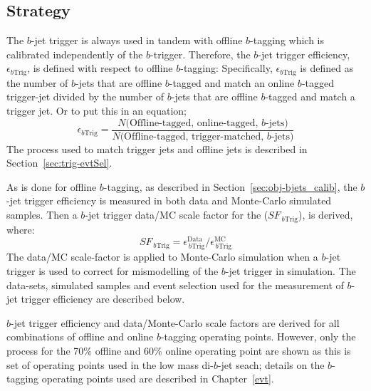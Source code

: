 \subsection{Strategy}
\label{sec:trig-bjet_strat}

The $b$-jet trigger is always used in tandem with offline $b$-tagging which is calibrated independently of the $b$-trigger.
Therefore, the $b$-jet trigger efficiency, $\epsilon_{b\text{Trig}}$, is defined with respect to offline $b$-tagging:
Specifically, $\epsilon_{b\text{Trig}}$ is defined as the number of $b$-jets that are offline $b$-tagged and match an online $b$-tagged trigger-jet
divided by the number of $b$-jets that are offline $b$-tagged and match a trigger jet.
Or to put this in an equation;
\begin{equation}
 \epsilon_{b\text{Trig}} = \frac{N(\text{Offline-tagged, online-tagged, $b$-jets)}}{N(\text{Offline-tagged, trigger-matched, $b$-jets)}}
\end{equation}
The process used to match trigger jets and offline jets is described in Section~\ref{sec:trig-evtSel}.

As is done for offline $b$-tagging, as described in Section~\ref{sec:obj-bjets_calib},
the $b$-jet trigger efficiency is measured in both data and Monte-Carlo simulated samples.
Then a $b$-jet trigger data/MC scale factor for the  ($SF_{\,b\text{Trig}}$), is derived, where:
\begin{equation}
 SF_{\,b\text{Trig}} = \epsilon_{\,b\text{Trig}}^{\text{Data}}/\epsilon_{\,b\text{Trig}}^{\text{MC}}
\end{equation}
The data/MC scale-factor is applied to Monte-Carlo simulation when a $b$-jet trigger is used to correct for mismodelling of the $b$-jet trigger in simulation.
The data-sets, simulated samples and event selection used for the measurement of $b$-jet trigger efficiency are described below.

$b$-jet trigger efficiency and data/Monte-Carlo scale factors are derived for all combinations of offline and online $b$-tagging operating points.
However, only the process for the 70\% offline and 60\% online operating point are shown
as this is set of operating points used in the low mass di-$b$-jet seach;
details on the $b$-tagging operating points used are described in Chapter~\ref{evt}.

